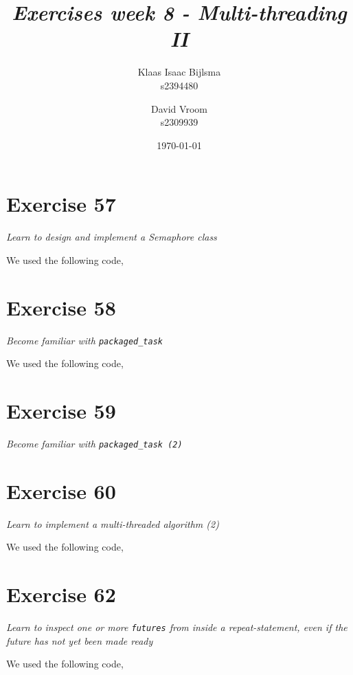 \documentclass[12pt]{article}
\title{\itshape Exercises week 8 - Multi-threading II}
\author{
	Klaas Isaac Bijlsma \\ s2394480
	\and
	David Vroom \\ s2309939
}
\date{\today}
\newcommand{\desc}[1]{\textit{#1} \vspace{1em}}
\begin{document}
\maketitle

\section*{Exercise 57}
\desc{Learn to design and implement a Semaphore class}

We used the following code,

 
 




\clearpage

\section*{Exercise 58}
\desc{Become familiar with \texttt{packaged\_task}}

We used the following code,



\clearpage

\section*{Exercise 59}
\desc{Become familiar with \texttt{packaged\_task (2)}}



\clearpage

\section*{Exercise 60}
\desc{Learn to implement a multi-threaded algorithm (2)}

We used the following code,



\clearpage

\section*{Exercise 62}
\desc{Learn to inspect one or more \texttt{futures} from inside a repeat-statement, even if the future has not yet been made ready}

We used the following code,



\clearpage
\end{document}
